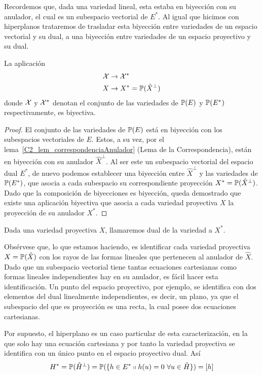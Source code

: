 Recordemos que, dada una variedad lineal, esta estaba en biyección con su anulador, el cual es un subespacio vectorial de $E^*$. Al igual que hicimos con hiperplanos trataremos de trasladar esta biyección entre variedades de un espacio vectorial y su dual, a una biyección entre variedades de un espacio proyectivo y su dual.
\begin{lem}
	\label{C2_lem_correspondencia_proy_anulador}
	La aplicación 
	\begin{equation*}
		\begin{split}
			\mathcal{X}& \rightarrow \mathcal{X}^*\\
			X& \rightarrow X^*=\mathbb{P}(\hat{X}^{\perp})
		\end{split}
	\end{equation*}
	donde $\mathcal{X}$ y $\mathcal{X}^*$ denotan el conjunto de las variedades de $\mathbb{P}(E)$ y $\mathbb{P}(E^*)$ respectivamente, es biyectiva.
\end{lem}
\begin{proof}
	El conjunto de las variedades de $\mathbb{P}(E)$ está en biyección con los subespacios vectoriales de $E$. Estos, a su vez, por el lema~\ref{C2_lem_correspondenciaAnulador} (Lema de la Correspondencia), están en biyección con su anulador $\hat{X}^\perp$. Al ser este un subespacio vectorial del espacio dual $E^*$, de nuevo podemos establecer una biyección entre $\hat{X}^{\perp}$ y las variedades de $\mathbb{P}(E^*)$, que asocia a cada subespacio su correspondiente proyección $X^*=\mathbb{P} (\hat{X}^{\perp})$. Dado que la composición de biyecciones es biyección, queda demostrado que existe una aplicación biyectiva que asocia a cada variedad proyectiva $X$ la proyección de su anulador $X^*$.
\end{proof}

Dada una variedad proyectiva $X$, llamaremos dual de la variedad a $X^*$.

Obsérvese que, lo que estamos haciendo, es identificar cada variedad proyectiva $X=\mathbb{P}(\hat{X})$ con los rayos de las formas lineales que pertenecen al anulador de $\hat{X}$. Dado que un subespacio vectorial tiene tantas ecuaciones cartesianas como formas lineales independientes hay en su anulador, es fácil hacer esta identificación. Un punto del espacio proyectivo, por ejemplo, se identifica con dos elementos del dual linealmente independientes, es decir, un plano, ya que el subespacio del que es proyección es una recta, la cual posee dos ecuaciones cartesianas.

Por supuesto, el hiperplano es un caso particular de esta caracterización, en la que solo hay una ecuación cartesiana y por tanto la variedad proyectiva se identifica con un único punto en el espacio proyectivo dual. Así
\begin{equation}
H^*=\mathbb{P}(\hat{H}^{\perp})=\mathbb{P}(\{h\in E^*\shortparallel h(u)=0\ \forall u\in \hat{H}\})=[h]
\end{equation}

